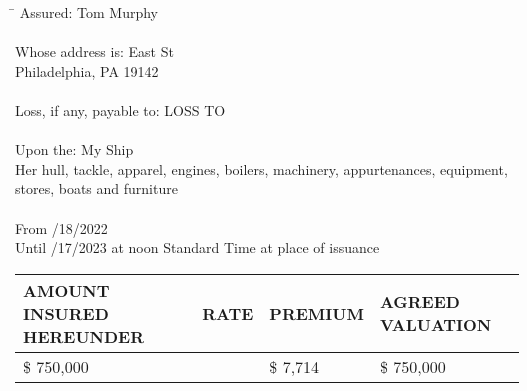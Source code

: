 \documentclass[10pt]{article}
\begin{document}
\begin{tabbing}
    \hspace{2in} \=\kill
    Assured: \> Tom Murphy \\
    \\
    Whose address is:  East St \\
     \> Philadelphia, PA 19142 \\
    \\
    Loss, if any, payable to: \> LOSS TO \\
    \\
    
    Upon the: \> My Ship \\
    Her   hull,   tackle,   apparel,   engines,   boilers,   machinery,   appurtenances,   equipment,   stores,   boats   and   furniture \\
    \\
    
    From /18/2022 \\
    Until /17/2023 at noon Standard Time at place of issuance \\
\end{tabbing}


\begin{center}
    \begin{tabular}{ | C{3in} | C{0.75in} | C{1in} | C{1.75in} | }
    \hline
    \textbf{AMOUNT INSURED HEREUNDER} & \textbf{RATE} & \textbf{PREMIUM} & \textbf{AGREED VALUATION} \\
    \hline
    \$ 750,000 &  & \$ 7,714 & \$ 750,000 \\
    \hline
    \end{tabular}
\end{center}
\end{document}
